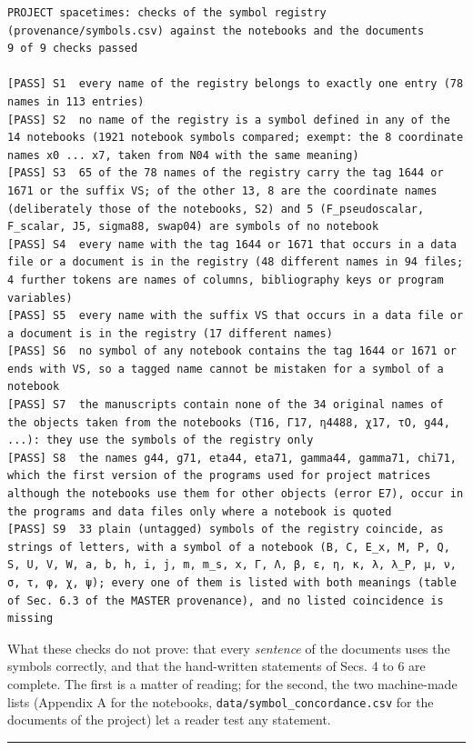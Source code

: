 \documentclass[
  10pt,
]{article}
\begin{document}
\begin{verbatim}
PROJECT spacetimes: checks of the symbol registry (provenance/symbols.csv) against the notebooks and the documents
9 of 9 checks passed

[PASS] S1  every name of the registry belongs to exactly one entry (78 names in 113 entries)
[PASS] S2  no name of the registry is a symbol defined in any of the 14 notebooks (1921 notebook symbols compared; exempt: the 8 coordinate names x0 ... x7, taken from N04 with the same meaning)
[PASS] S3  65 of the 78 names of the registry carry the tag 1644 or 1671 or the suffix VS; of the other 13, 8 are the coordinate names (deliberately those of the notebooks, S2) and 5 (F_pseudoscalar, F_scalar, J5, sigma88, swap04) are symbols of no notebook
[PASS] S4  every name with the tag 1644 or 1671 that occurs in a data file or a document is in the registry (48 different names in 94 files; 4 further tokens are names of columns, bibliography keys or program variables)
[PASS] S5  every name with the suffix VS that occurs in a data file or a document is in the registry (17 different names)
[PASS] S6  no symbol of any notebook contains the tag 1644 or 1671 or ends with VS, so a tagged name cannot be mistaken for a symbol of a notebook
[PASS] S7  the manuscripts contain none of the 34 original names of the objects taken from the notebooks (T16, Γ17, η4488, χ17, τO, g44, ...): they use the symbols of the registry only
[PASS] S8  the names g44, g71, eta44, eta71, gamma44, gamma71, chi71, which the first version of the programs used for project matrices although the notebooks use them for other objects (error E7), occur in the programs and data files only where a notebook is quoted
[PASS] S9  33 plain (untagged) symbols of the registry coincide, as strings of letters, with a symbol of a notebook (B, C, E_x, M, P, Q, S, U, V, W, a, b, h, i, j, m, m_s, x, Γ, Λ, β, ε, η, κ, λ, λ_P, μ, ν, σ, τ, φ, χ, ψ); every one of them is listed with both meanings (table of Sec. 6.3 of the MASTER provenance), and no listed coincidence is missing
\end{verbatim}

What these checks do not prove: that every \emph{sentence} of the
documents uses the symbols correctly, and that the hand-written
statements of Secs. 4 to 6 are complete. The first is a matter of
reading; for the second, the two machine-made lists (Appendix A for the
notebooks, \texttt{data/symbol\_concordance.csv} for the documents of
the project) let a reader test any statement.

\begin{center}\rule{0.5\linewidth}{0.5pt}\end{center}
\end{document}
